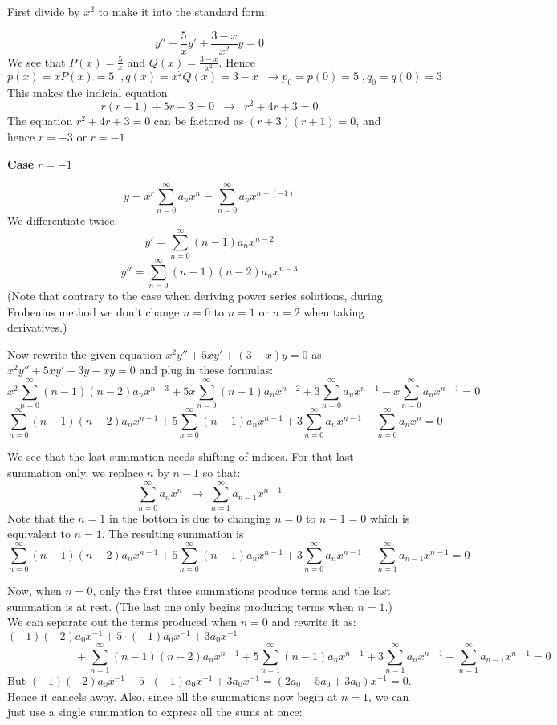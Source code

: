 \documentclass[12pt]{report}
\begin{document}
First divide by $x^2$ to make it into the standard form:

$$ y'' + \frac{5}{x} y' + \frac{3-x}{x^2} y =0 $$
We see that $P(x)=\frac{5}{x}$ and $Q(x)= \frac{3-x}{x^2}$. Hence
$$p(x) = x P(x) = 5 \; \; ,  q(x) = x^2 Q(x) = 3-x \; \; \rightarrow p_0=p(0)=5 \;, q_0=q(0)= 3$$
This makes the indicial equation
$$r(r-1) + 5 r + 3 = 0 \; \; \rightarrow \; \; r^2 + 4r + 3 =0 $$
The equation $ r^2 + 4r + 3 =0$ can be factored as $(r+3)(r+1)=0$, and hence $r=-3$ or $r=-1$

\textbf{Case } $r=-1$

$$y = x^r \sum_{n=0}^{\infty} a_n x^n  = \sum_{n=0}^{\infty} a_n x^{n+(-1)}$$
We differentiate twice:
$$y' = \sum_{n=0}^{\infty} (n-1) a_n x^{n-2} $$
$$y'' = \sum_{n=0}^{\infty} (n-1)(n-2) a_n x^{n-3} $$
(Note that contrary to the case when deriving power series solutions, during Frobenius method we don't change $n=0$ to $n=1$ or $n=2$ when taking derivatives.)

Now rewrite the given equation $x^2 y'' + 5xy' + (3-x) y =0$ as $x^2 y'' + 5xy' + 3y -xy =0$ and plug in these formulas:
$$ x^2  \sum_{n=0}^{\infty} (n-1)(n-2) a_n x^{n-3} + 5x \sum_{n=0}^{\infty} (n-1) a_n x^{n-2} + 3 \sum_{n=0}^{\infty} a_n x^{n-1} - x  \sum_{n=0}^{\infty} a_n x^{n-1} = 0$$
$$  \sum_{n=0}^{\infty} (n-1)(n-2) a_n x^{n-1} + 5 \sum_{n=0}^{\infty} (n-1) a_n x^{n-1} + 3 \sum_{n=0}^{\infty} a_n x^{n-1} - \sum_{n=0}^{\infty} a_n x^{n} = 0$$

We see that the last summation needs shifting of indices. For that last summation only, we replace $n$ by $n-1$ so that:
$$\sum_{n=0}^{\infty} a_n x^{n} \; \; \rightarrow \; \sum_{n=1}^{\infty} a_{n-1} x^{n-1}  $$
Note that the $n=1$ in the bottom is due to changing $n=0$ to $n-1=0$ which is equivalent to $n=1$. The resulting summation is 
$$  \sum_{n=0}^{\infty} (n-1)(n-2) a_n x^{n-1} + 5 \sum_{n=0}^{\infty} (n-1) a_n x^{n-1} + 3 \sum_{n=0}^{\infty} a_n x^{n-1} - \sum_{n=1}^{\infty} a_{n-1} x^{n-1} = 0 $$

Now, when $n=0$, only the first three summations produce terms and the last summation is at rest. (The last one only begins producing terms when $n=1$.) We can separate out the terms produced when $n=0$ and rewrite it as:
$$ (-1)(-2)a_0 x^{-1} + 5\cdot (-1)a_0 x^{-1} + 3a_0 x^{-1}\qquad \qquad \qquad \qquad \qquad \qquad \qquad \qquad \qquad \qquad$$
$$ \qquad \qquad \qquad + \sum_{n=1}^{\infty} (n-1)(n-2) a_n x^{n-1} + 5 \sum_{n=1}^{\infty} (n-1) a_n x^{n-1} + 3 \sum_{n=1}^{\infty} a_n x^{n-1} - \sum_{n=1}^{\infty} a_{n-1} x^{n-1} = 0 $$
But $ (-1)(-2)a_0x^{-1} + 5\cdot (-1)a_0 x^{-1}+ 3a_0 x^{-1} = (2a_0 -5a_0 + 3a_0)x^{-1} =0$. Hence it cancels away. Also, since all the summations now begin at $n=1$, we can just use a single summation to express all the sums at once:
\end{document}
